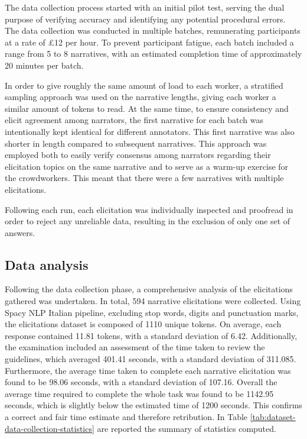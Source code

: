 The data collection process started with an initial pilot test, serving the dual purpose of verifying accuracy and identifying any potential procedural errors. The data collection was conducted in multiple batches, remunerating participants at a rate of £12 per hour. To prevent participant fatigue, each batch included a range from 5 to 8 narratives, with an estimated completion time of approximately 20 minutes per batch.

In order to give roughly the same amount of load to each worker, a stratified sampling approach was used on the narrative lengths, giving each worker a similar amount of tokens to read. At the same time, to ensure consistency and elicit agreement among narrators, the first narrative for each batch was intentionally kept identical for different annotators. This first narrative was also shorter in length compared to subsequent narratives. This approach was employed both to easily verify consensus among narrators regarding their elicitation topics on the same narrative and to serve as a warm-up exercise for the crowdworkers. This meant that there were a few narratives with multiple elicitations.

Following each run, each elicitation was individually inspected and proofread in order to reject any unreliable data, resulting in the exclusion of only one set of answers.


\subsection{Data analysis}
\label{cha:methodology-crowdsourcing-data-analysis}


Following the data collection phase, a comprehensive analysis of the elicitations gathered was undertaken. In total, 594 narrative elicitations were collected. Using Spacy NLP Italian pipeline, excluding stop words, digits and punctuation marks, the elicitations dataset is composed of 1110 unique tokens. On average, each response contained 11.81 tokens, with a standard deviation of 6.42. Additionally, the examination included an assessment of the time taken to review the guidelines, which averaged 401.41 seconds, with a standard deviation of 311.085. Furthermore, the average time taken to complete each narrative elicitation was found to be 98.06 seconds, with a standard deviation of 107.16. Overall the average time required to complete the whole task was found to be 1142.95 seconds, which is slightly below the estimated time of 1200 seconds. This confirms a correct and fair time estimate and therefore retribution. In Table \ref{tab:dataset-data-collection-statistics} are reported the summary of statistics computed. 

